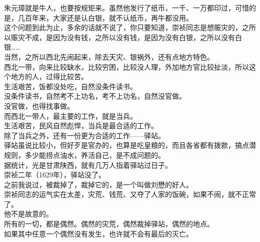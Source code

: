 \begin{multicols}{\theparacolNo}
朱元璋就是牛人，也要按规矩来。虽然他发行了纸币，一千、一万都印过，可惜的是，几百年来，大家还是认白银，就不认纸币，再牛都没用。\\

这个问题到此为止，多余的话就不说了，你只要知道，崇祯同志是想赈灾的，之所以赈灾不成，是因为没有钱，之所以没有钱，是因为没有白银，之所以没有白银……\\

当然，之所以西北先闹起来，除去天灾、银祸外，还有点地方特色。\\

西北一带，向来比较缺水，比较穷困，比较没人理，外加地方官比较扯淡，所以这个地方的人，过得比较苦。\\

生活艰苦，饭都没处吃，自然没条件读书。\\

没条件读书，自然考不上功名，考不上功名，自然没官做。\\

没官做，也得找事做。\\

而西北一带人，最主要的工作，就是当兵。\\

生活艰苦，民风自然彪悍，当兵是最合适的工作。\\

除了当兵之外，还有一份更为合适的工作——驿站。\\

驿站虽说比较小，但好歹是官办的，也算是吃皇粮的，而且各省都有拨款，搞点潜规则，多少能捞点油水，养活自己，是不成问题的。\\

据统计，光是甘肃陕西，就有几万人指着驿站过日子。\\

崇祯二年（1629年），驿站没了。\\

之前我说过，被裁掉了，裁掉它的，是一个叫做刘懋的好人。\\

崇祯同志的运气实在太差，灾荒、钱荒、又夺了人家的饭碗，如果不闹，就不正常了。\\

他不是故意的。\\

所有的一切，都是偶然。偶然的灾荒，偶然裁掉驿站，偶然的地点。\\

如果其中任意一个偶然没有发生，也许就不会有最后的灭亡。\\


\end{multicols}
